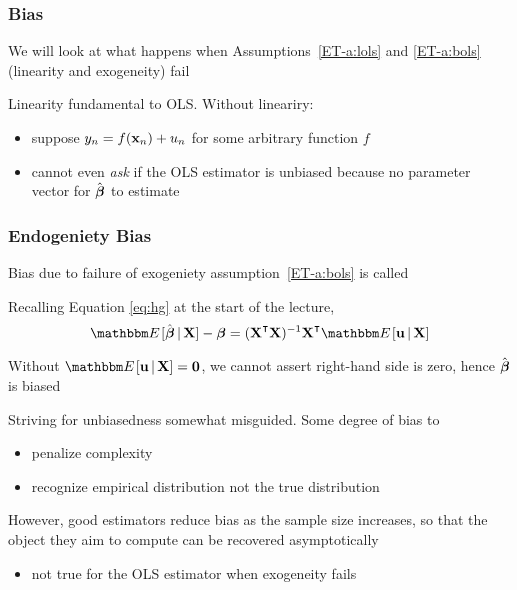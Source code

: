 \begin{frame}\frametitle{Bias}

    \vspace{2em}
    We will look at what happens when  Assumptions~\ref{ET-a:lols}
    and \ref{ET-a:bols} (linearity and exogeneity) fail 
    
    \vspace{.7em}
    Linearity fundamental to OLS. Without lineariry:
    \begin{itemize}
        \item suppose  $y_n =
        f({\mathbf x}_n) + u_n$ for some arbitrary function $f$
        \item  cannot even \emph{ask} if the OLS estimator is unbiased
                because no parameter vector for $\hat {\boldsymbol \beta}$ to estimate
    \end{itemize}
    
\end{frame}

\begin{frame}\frametitle{Endogeniety Bias} 
    
    \vspace{2em}
    Bias due to
    failure of exogeniety assumption~\ref{ET-a:bols} is called   
    
    \vspace{.7em}
    Recalling Equation \eqref{eq:hg} at the start of the lecture,
    \begin{equation}
        \label{eq:bien}
        \EE [ \hboldbeta \given \boldX ] - 
        \boldbeta = (\boldX^\T \boldX)^{-1} \boldX^\T \EE[ \boldu \given \boldX]
    \end{equation}
    
    Without $\EE [ \boldu \given \boldX ] = \boldzero$, we cannot assert 
    right-hand side is zero, hence $\hat {\boldsymbol \beta}$ is biased 

\end{frame}

\begin{frame}
    
    \vspace{2em}
    Striving for unbiasedness somewhat misguided. Some degree of bias to
    \begin{itemize}
        \item penalize complexity
        \item recognize empirical distribution not the true
            distribution
    \end{itemize}
    
    \vspace{.7em}
    However, good estimators reduce bias as the sample size increases, so
        that the object they aim to compute can be recovered asymptotically
    \begin{itemize}
        \item not true for the OLS estimator when exogeneity fails
    \end{itemize}
    
\end{frame}

